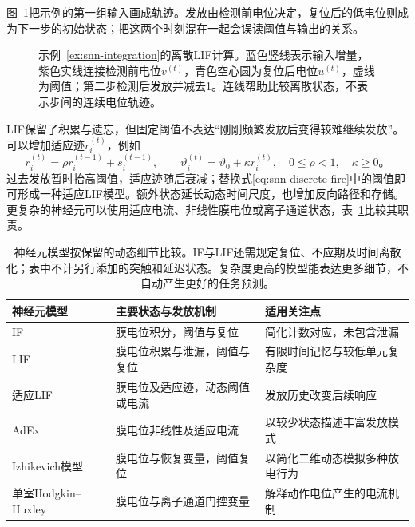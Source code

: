 图~\ref{fig:snn-lif}把示例的第一组输入画成轨迹。发放由检测前电位决定，复位后的低电位则成为下一步的初始状态；把这两个时刻混在一起会误读阈值与输出的关系。
\begin{figure}[htbp]
  \centering
  
  \caption{示例~\ref{ex:snn-integration}的离散LIF计算。蓝色竖线表示输入增量，紫色实线连接检测前电位$v^{(t)}$，青色空心圆为复位后电位$u^{(t)}$，虚线为阈值；第二步检测后发放并减去1。连线帮助比较离散状态，不表示步间的连续电位轨迹。}
  \label{fig:snn-lif}
\end{figure}

LIF保留了积累与遗忘，但固定阈值不表达“刚刚频繁发放后变得较难继续发放”。可以增加适应迹$r_i^{(t)}$，例如
\begin{equation}
  r_i^{(t)}=\rho r_i^{(t-1)}+s_i^{(t-1)},\qquad
  \vartheta_i^{(t)}=\vartheta_0+\kappa r_i^{(t)},
  \quad 0\leq\rho<1,\quad\kappa\geq0\text{。}
  \label{eq:snn-adaptive-threshold}
\end{equation}
过去发放暂时抬高阈值，适应迹随后衰减；替换式\eqref{eq:snn-discrete-fire}中的阈值即可形成一种适应LIF模型。额外状态延长动态时间尺度，也增加反向路径和存储。更复杂的神经元可以使用适应电流、非线性膜电位或离子通道状态，表~\ref{tab:snn-neuron-models}比较其职责。
\begin{table}[htbp]
  \centering\small
  \begin{tabularx}{\linewidth}{@{}p{34mm}p{49mm}X@{}}
    \toprule
    神经元模型 & 主要状态与发放机制 & 适用关注点 \\
    \midrule
    IF & 膜电位积分，阈值与复位 & 简化计数对应，未包含泄漏 \\
    LIF & 膜电位积累与泄漏，阈值与复位 & 有限时间记忆与较低单元复杂度 \\
    适应LIF & 膜电位及适应迹，动态阈值或电流 & 发放历史改变后续响应 \\
    AdEx & 膜电位非线性及适应电流 & 以较少状态描述丰富发放模式 \\
    Izhikevich模型 & 膜电位与恢复变量，阈值复位 & 以简化二维动态模拟多种放电行为 \\
    单室Hodgkin--Huxley & 膜电位与离子通道门控变量 & 解释动作电位产生的电流机制 \\
    \bottomrule
  \end{tabularx}
  \caption{神经元模型按保留的动态细节比较。IF与LIF还需规定复位、不应期及时间离散化；表中不计另行添加的突触和延迟状态。复杂度更高的模型能表达更多细节，不自动产生更好的任务预测。}
  \label{tab:snn-neuron-models}
\end{table}
\FloatBarrier

